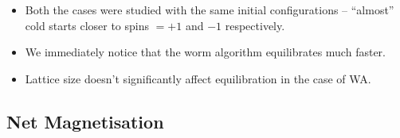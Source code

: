 \documentclass{beamer}
\begin{document}
\begin{frame}
\begin{itemize}
    \item Both the cases were studied with the same initial configurations – ``almost'' cold starts closer to spins $= +1$ and $-1$ respectively.
    \item We immediately notice that the worm algorithm equilibrates much faster.
    \item Lattice size doesn't significantly affect equilibration in the case of WA.
\end{itemize}
\end{frame}

\subsection{Net Magnetisation}
\end{document}
